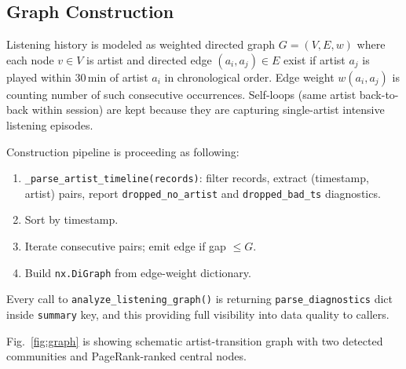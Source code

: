 \documentclass[conference]{IEEEtran}
\begin{document}
\subsection{Graph Construction}

Listening history is modeled as weighted directed graph $G = (V, E, w)$ where each node $v \in V$ is artist and directed edge $(a_i, a_j) \in E$ exist if artist $a_j$ is played within 30\,min of artist $a_i$ in chronological order. Edge weight $w(a_i, a_j)$ is counting number of such consecutive occurrences. Self-loops (same artist back-to-back within session) are kept because they are capturing single-artist intensive listening episodes.

Construction pipeline is proceeding as following:
\begin{enumerate}
  \item \texttt{\_parse\_artist\_timeline(records)}: filter records,
        extract (timestamp, artist) pairs, report
        \texttt{dropped\_no\_artist} and \texttt{dropped\_bad\_ts}
        diagnostics.
  \item Sort by timestamp.
  \item Iterate consecutive pairs; emit edge if gap $\leq G$.
  \item Build \texttt{nx.DiGraph} from edge-weight dictionary.
\end{enumerate}
Every call to \texttt{analyze\_listening\_graph()} is returning \texttt{parse\_diagnostics} dict inside \texttt{summary} key, and this providing full visibility into data quality to callers.

Fig.~\ref{fig:graph} is showing schematic artist-transition graph with two detected communities and PageRank-ranked central nodes.
\end{document}
